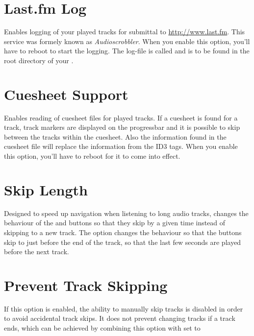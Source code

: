 \section{Last.fm Log}
  Enables logging of your played tracks for submittal to 
  \url{http://www.last.fm}. This service was formely known as 
  \emph{Audioscrobbler}. When you enable this option, you'll have to reboot to
  start the logging. The log-file is called 
  and is to be found in the root directory of your \dap{}.\\


\section{Cuesheet Support}
  Enables reading of cuesheet files for played tracks. If a cuesheet is found
  for a track, track markers are displayed on the progressbar and it is
  possible to skip between the tracks within the cuesheet. Also the information
  found in the cuesheet file will replace the information from the ID3 tags.
  When you enable this option, you'll have to reboot for it to come into
  effect.
  
\section{Skip Length}
  Designed to speed up navigation when listening to long audio tracks,
   changes the behaviour of
  the \ActionWpsSkipPrev{} and \ActionWpsSkipNext{} buttons so that they skip
  by a given time instead of skipping to a new track.
  The  option changes the behaviour so that the buttons
  skip to just before the end of the track, so that the last few seconds are
  played before the next track.

\section{Prevent Track Skipping}
  If this option is enabled, the ability to manually skip tracks is disabled
  in order to avoid accidental track skips. It does not prevent changing tracks
  if a track ends, which can be achieved by combining this option with
   set to 

